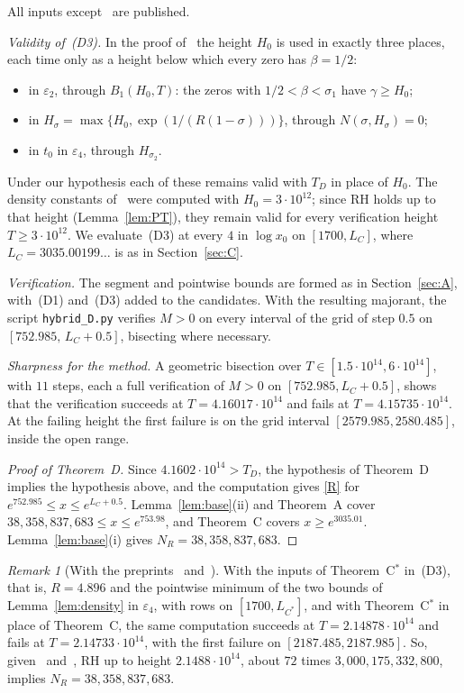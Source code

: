 \documentclass{amsart}
\theoremstyle{definition}
\theoremstyle{remark}
\newtheorem{remark}[theorem]{Remark}
\theoremstyle{plain}
\numberwithin{equation}{section}
\newcommand{\eps}{\varepsilon}
\newcommand{\NN}{38{,}358{,}837{,}683}
\newcommand{\HRH}{3{,}000{,}175{,}332{,}800}
\newcommand{\TDhyp}{4.1602\cdot10^{14}}
\newcommand{\TDuse}{4.16017\cdot10^{14}}
\newcommand{\TDpre}{2.1488\cdot10^{14}}
\newcommand{\Cstar}{C$^*$}
\begin{document}
All inputs except~\cite{CH25} are published.

\emph{Validity of~(D3).} In the proof of~\cite[Thm.~1.1]{FKS23} the height $H_0$ is used in exactly three places, each time only as a height below which every zero has $\beta=1/2$:
\begin{itemize}
\item in $\eps_2$, through $B_1(H_0,T)$: the zeros with $1/2<\beta<\sigma_1$ have $\gamma\ge H_0$;
\item in $H_\sigma=\max\{H_0,\exp(1/(R(1-\sigma)))\}$, through $N(\sigma,H_\sigma)=0$;
\item in $t_0$ in $\eps_4$, through $H_{\sigma_2}$.
\end{itemize}
Under our hypothesis each of these remains valid with $T_D$ in place of $H_0$. The density constants of~\cite[Thm.~2.7]{FKS23} were computed with $H_0=3\cdot10^{12}$; since RH holds up to that height (Lemma~\ref{lem:PT}), they remain valid for every verification height $T\ge3\cdot10^{12}$. We evaluate~(D3) at every $4$ in $\log x_0$ on $[1700,L_C]$, where $L_C=3035.00199\ldots$ is as in Section~\ref{sec:C}.

\emph{Verification.} The segment and pointwise bounds are formed as in Section~\ref{sec:A}, with~(D1) and~(D3) added to the candidates. With the resulting majorant, the script \texttt{hybrid\_D.py} verifies $M>0$ on every interval of the grid of step $0.5$ on $[752.985,\,L_C+0.5]$, bisecting where necessary.

\emph{Sharpness for the method.} A geometric bisection over $T\in[1.5\cdot10^{14},6\cdot10^{14}]$, with $11$ steps, each a full verification of $M>0$ on $[752.985,L_C+0.5]$, shows that the verification succeeds at $T=\TDuse$ and fails at $T=4.15735\cdot10^{14}$. At the failing height the first failure is on the grid interval $[2579.985,2580.485]$, inside the open range.

\begin{proof}[Proof of Theorem~D]
Since $\TDhyp>T_D$, the hypothesis of Theorem~D implies the hypothesis above, and the computation gives \eqref{R} for $e^{752.985}\le x\le e^{L_C+0.5}$. Lemma~\ref{lem:base}(ii) and Theorem~A cover $\NN\le\allowbreak x\le\allowbreak e^{753.98}$, and Theorem~C covers $x\ge e^{3035.01}$. Lemma~\ref{lem:base}(i) gives $N_R=\NN$.
\end{proof}

\begin{remark}[With the preprints~\cite{BTY26} and~\cite{Bel24}]\label{rem:Dpre}
With the inputs of Theorem~\Cstar{} in~(D3), that is, $R=4.896$ and the pointwise minimum of the two bounds of Lemma~\ref{lem:density} in $\eps_4$, with rows on $[1700,L_{C^*}]$, and with Theorem~\Cstar{} in place of Theorem~C, the same computation succeeds at $T=2.14878\cdot10^{14}$ and fails at $T=2.14733\cdot10^{14}$, with the first failure on $[2187.485,2187.985]$. So, given~\cite{BTY26} and~\cite{Bel24}, RH up to height $\TDpre$, about $72$ times $\HRH$, implies $N_R=\NN$.
\end{remark}
\end{document}

